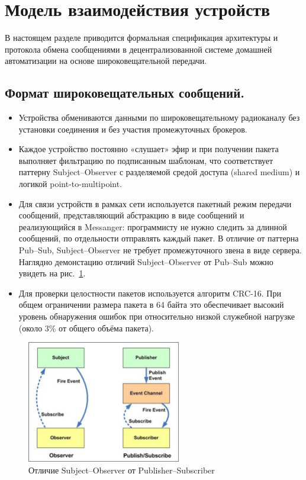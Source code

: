 \documentclass[14pt, a4paper]{extreport}
\begin{document}
\section{Модель взаимодействия устройств}

В настоящем разделе приводится формальная спецификация архитектуры и протокола обмена сообщениями в децентрализованной системе домашней автоматизации на основе широковещательной передачи.

\subsection{Формат широковещательных сообщений.}

\begin{itemize}
  \item Устройства обмениваются данными по широковещательному радиоканалу без установки соединения и без участия промежуточных брокеров.
  
  \item Каждое устройство постоянно «слушает» эфир и при получении пакета выполняет фильтрацию по подписанным шаблонам, что соответствует паттерну Subject--Observer с разделяемой
  средой доступа (shared medium) и логикой point-to-multipoint.
  
  \item Для связи устройств в рамках сети используется пакетный режим передачи сообщений, представляющий абстракцию в виде сообщений и реализующийся в Messanger: программисту не
  нужно следить за длинной сообщений, по отдельности отправлять каждый пакет. В отличие от паттерна Pub--Sub, Subject--Observer не требует промежуточного звена в виде сервера.
  Наглядно демонстацию отличий Subject--Observer от Pub--Sub можно увидеть на рис.~\ref{fig:Observer_vs_pub_sub}.

  \item Для проверки целостности пакетов используется алгоритм CRC-16. При общем ограничении размера пакета в 64 байта это обеспечивает высокий уровень обнаружения ошибок при
  относительно низкой служебной нагрузке (около 3\% от общего объёма пакета).
\end{itemize}

\begin{figure}[ht]
    \centering
    \includegraphics[width=0.6\textwidth]{images/Fig08.png}
    \caption{Отличие Subject--Observer от Publisher--Subscriber \cite{IMG_observer_vs_pub_sub}}
    \label{fig:Observer_vs_pub_sub}
\end{figure}
\end{document}
